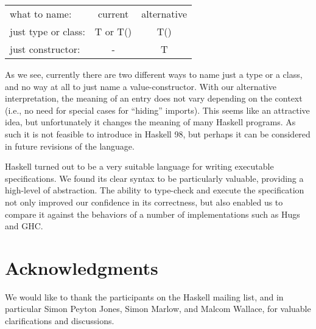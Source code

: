\begin{tabular}{lcc}
what to name: &            current   &  alternative \\
just type or class:     & T or T()   &   T()       \\
just constructor:       & -          &   T 
\end{tabular}

As we see, currently there are two different ways to name just a type
or a class, and no way at all to just name a value-constructor.
With our alternative interpretation,
the meaning of an entry does not vary depending on the context (i.e., 
no need for special cases for ``hiding'' imports).  This seems like an
attractive idea, but unfortunately it changes the meaning of many Haskell
programs.  As such it is not feasible to introduce in Haskell 98, but
perhaps it can be considered in future revisions of the language.

Haskell turned out to be a very suitable language for writing 
executable specifications.  We found its clear syntax to be particularly 
valuable, providing a high-level of abstraction.  
The ability to type-check and execute the
specification not only improved our confidence in its correctness, but
also enabled us to compare it against the behaviors of a number of 
implementations such as Hugs and GHC.

\section{Acknowledgments}
We would like to thank the participants on the Haskell mailing list,
and in particular Simon Peyton Jones, Simon Marlow, and Malcom Wallace,
for valuable clarifications and discussions.   
